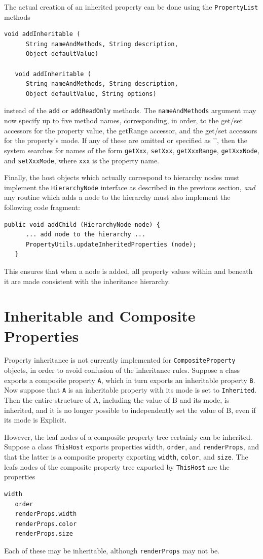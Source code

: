 The actual creation of an inherited property can be done using the
{\tt PropertyList} methods
\begin{lstlisting}[]
   void addInheritable (
      String nameAndMethods, String description, 
      Object defaultValue)
    
   void addInheritable (
      String nameAndMethods, String description, 
      Object defaultValue, String options)
\end{lstlisting}
instead of the {\tt add} or {\tt addReadOnly} methods. The {\tt nameAndMethods}
argument may now specify up to five method names, corresponding, in
order, to the get/set accessors for the property value, the getRange
accessor, and the get/set accessors for the property's mode.  If any
of these are omitted or specified as '{\tt *}', then the system
searches for names of the form
{\tt getXxx}, {\tt setXxx}, {\tt getXxxRange}, {\tt getXxxNode}, 
and {\tt setXxxMode}, where
{\tt xxx} is the property name.

Finally, the host objects which actually correspond to hierarchy nodes
must implement the {\tt HierarchyNode} interface as described in the
previous section, {\it and} any routine which adds a node to the
hierarchy must also implement the following code fragment:
\begin{lstlisting}[]
   public void addChild (HierarchyNode node) {
      ... add node to the hierarchy ...
      PropertyUtils.updateInheritedProperties (node);
   }      
\end{lstlisting}
This ensures that when a node is added, all property values within and
beneath it are made consistent with the inheritance hierarchy.

\section{Inheritable and Composite Properties}

Property inheritance is not currently implemented for 
{\tt CompositeProperty} objects, in order to avoid confusion of the
inheritance rules. Suppose a class exports a composite property 
{\tt A}, which in turn exports an inheritable property {\tt B}.  Now
suppose that {\tt A} is an inheritable property with its mode is set
to {\tt Inherited}. Then the entire structure of A, including the
value of B and its mode, is inherited, and it is no longer possible to
independently set the value of B, even if its mode is Explicit.

However, the leaf nodes of a composite property tree certainly can be
inherited. Suppose a class {\tt ThisHost} exports properties 
{\tt width}, {\tt order}, and {\tt renderProps}, and that the latter is a
composite property exporting {\tt width}, {\tt color}, and {\tt size}.
The leafs nodes of the composite property tree exported
by {\tt ThisHost} are the properties
\begin{lstlisting}[]
   width
   order
   renderProps.width
   renderProps.color
   renderProps.size
\end{lstlisting}
Each of these may be inheritable, although {\tt renderProps} may not be. 

